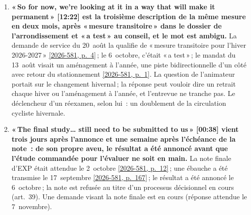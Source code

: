 \documentclass[10pt,letterpaper]{article}
\newcommand{\pagesurl}{https://openmobilitydata.github.io/Terrebonne-access-requests}
\newcommand{\cliptime}[1]{\textsf{\small[#1]}}
\newcommand{\pgl}[2]{\href{\pagesurl/2026-581/raw/01_emails_mandate_counts.pdf\#page=#1}{\textsf{\small[2026-581, p.~#2]}}}
\newcommand{\pg}[1]{\pgl{#1}{#1}}
\begin{document}
\begin{enumerate}[nosep,itemsep=0.3em,leftmargin=1.4em]
  \item \begin{minipage}[t]{\linewidth}\textbf{«\,So for now, we're looking at it in a way that will make it permanent\,» \cliptime{12:22} est la troisième description de la même mesure en deux mois, après «\,mesure transitoire\,» dans le dossier de l'arrondissement et «\,a test\,» au conseil, et le mot est ambigu.} La demande de service du 20~août la qualifie de «\,mesure transitoire pour l'hiver 2026-2027\,» \pg{4}\,; le 6~octobre, c'était «\,a test\,»\,; le mandat du 13~août visait un aménagement à l'année, une piste bidirectionnelle d'un côté avec retour du stationnement \pg{1}. La question de l'animateur portait sur le changement hivernal\,; la réponse peut vouloir dire un retrait chaque hiver ou l'aménagement à l'année, et l'entrevue ne tranche pas. Le déclencheur d'un réexamen, selon lui~: un doublement de la circulation cycliste hivernale.\end{minipage}\vspace{0.35em}
  \item \begin{minipage}[t]{\linewidth}\textbf{«\,The final study… still need to be submitted to us\,» \cliptime{00:38} vient trois jours après l'annonce et une semaine après l'échéance de la note~: de son propre aveu, le résultat a été annoncé avant que l'étude commandée pour l'évaluer ne soit en main.} La note finale d'EXP était attendue le 2~octobre \pg{12}\,; une ébauche a été transmise le 17~septembre \pg{167}\,; le résultat a été annoncé le 6~octobre\,; la note est refusée au titre d'un processus décisionnel en cours (art.~39). Une demande visant la note finale est en cours (réponse attendue le 7~novembre).\end{minipage}\vspace{0.35em}

\end{enumerate}
\end{document}
